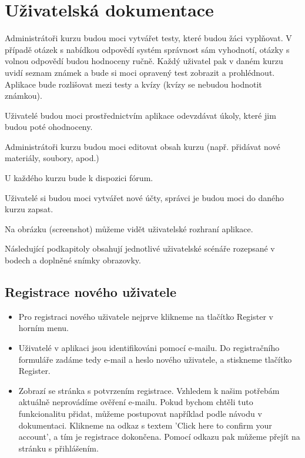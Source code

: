 \section{Uživatelská dokumentace}

Administrátoři kurzu budou moci vytvářet testy, které budou žáci vyplňovat. V případě otázek s nabídkou odpovědí systém správnost sám vyhodnotí, otázky s volnou odpovědí budou hodnoceny ručně. Každý uživatel pak v daném kurzu uvidí seznam známek a bude si moci opravený test zobrazit a prohlédnout. Aplikace bude rozlišovat mezi testy a kvízy (kvízy se nebudou hodnotit známkou).

Uživatelé budou moci prostřednictvím aplikace odevzdávat úkoly, které jim budou poté ohodnoceny.

Administrátoři kurzu budou moci editovat obsah kurzu (např. přidávat nové materiály, soubory, apod.) 

U každého kurzu bude k dispozici fórum. 

Uživatelé si budou moci vytvářet nové účty, správci je budou moci do daného kurzu zapsat.



Na obrázku (screenshot) můžeme vidět uživatelské rozhraní aplikace.

Následující podkapitoly obsahují jednotlivé uživatelské scénáře rozepsané v bodech a doplněné snímky obrazovky.

\subsection{Registrace nového uživatele}

\begin{itemize}
	\item Pro registraci nového uživatele nejprve klikneme na tlačítko Register v horním menu.
	\item Uživatelé v aplikaci jsou identifikováni pomocí e-mailu. Do registračního formuláře zadáme tedy e-mail a heslo nového uživatele, a stiskneme tlačítko Register.
	\item Zobrazí se stránka s potvrzením registrace. Vzhledem k našim potřebám aktuálně neprovádíme ověření e-mailu. Pokud bychom chtěli tuto funkcionalitu přidat, můžeme postupovat například podle návodu v dokumentaci. \cite{AspNetCoreDocs} Klikneme na odkaz s textem 'Click here to confirm your account', a tím je registrace dokončena. Pomocí odkazu pak můžeme přejít na stránku s přihlášením.
\end{itemize}

